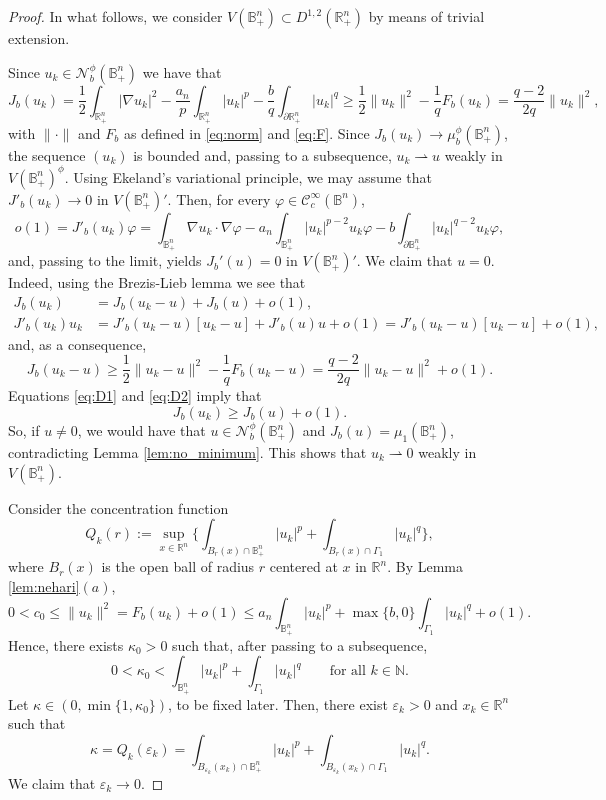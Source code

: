 \documentclass[10pt,a4paper]{amsart}
\def\D{\mathbb{B}^n_+}
\def\bn{\mathbb{B}^n}
\def\cC{\mathcal{C}}
\def\cN{\mathcal{N}}
\def\eps{\varepsilon}
\def\hn{\mathbb{R}^n_+}
\def\idhn{\int_{\partial\hn}}
\def\ihn{\int_{\hn}}
\def\n{\mathbb{N}}
\def\rh{\rightharpoonup}
\def\rn{\mathbb{R}^n}
\def\vp{\varphi}
\begin{document}
\begin{proof}
In what follows, we consider $V(\D)\subset D^{1,2}(\hn)$ by means of trivial extension. 

Since $u_k\in\cN_b^\phi(\D)$ we have that
$$J_b(u_k)=\frac{1}{2}\ihn|\nabla u_k|^2 - \frac{a_n}{p}\ihn|u_k|^p - \frac{b}{q}\idhn |u_k|^q\geq\frac{1}{2}\|u_k\|^2 - \frac{1}{q}F_b(u_k)=\frac{q-2}{2q}\|u_k\|^2,$$
with $\|\cdot\|$ and $F_b$ as defined in \eqref{eq:norm} and \eqref{eq:F}. Since $J_b(u_k)\to \mu^\phi_b(\D)$, the sequence $(u_k)$ is bounded and, passing to a subsequence, $u_k\rh u$ weakly in $V(\D)^\phi$. Using Ekeland's variational principle, we may assume that $J'_b(u_k)\to 0$ in $V(\D)'$. Then, for every $\vp\in \cC^\infty_c(\bn)$,
$$o(1)=J'_b(u_k)\vp=\int_{\D}\nabla u_k\cdot\nabla \vp - a_n\int_{\D} |u_k|^{p-2}u_k\vp - b\int_{\partial\D} |u_k|^{q-2}u_k\vp,$$
and, passing to the limit, yields $J_b'(u)=0$ in $V(\D)'$. We claim that $u=0$. Indeed, using the Brezis-Lieb lemma we see that
\begin{align}
J_b(u_k)&=J_b(u_k-u)+J_b(u)+o(1), \label{eq:D1}\\
J'_b(u_k)u_k&=J'_b(u_k-u)[u_k-u]+J'_b(u)u+o(1)=J'_b(u_k-u)[u_k-u]+o(1),\nonumber
\end{align}
and, as a consequence,
\begin{equation}\label{eq:D2}
J_b(u_k-u)\geq\frac{1}{2}\|u_k-u\|^2-\frac{1}{q}F_b(u_k-u)=\frac{q-2}{2q}\|u_k-u\|^2+o(1).
\end{equation}
Equations \eqref{eq:D1} and \eqref{eq:D2} imply that 
\begin{equation}\label{eq:D3}
J_b(u_k)\geq J_b(u)+o(1).
\end{equation}
So, if $u\neq 0$, we would have that $u\in\cN_b^\phi(\D)$ and $J_b(u)=\mu_1(\D)$, contradicting Lemma \ref{lem:no_minimum}. This shows that $u_k\rh 0$ weakly in $V(\D)$. 

Consider the concentration function
$$Q_k(r):=\sup _{x\in\rn}\Big\{\int_{B_r(x)\cap\D}|u_k|^p+\int_{B_r(x)\cap\Gamma_1}|u_k|^q\Big\},$$
where $B_r(x)$ is the open ball of radius $r$ centered at $x$ in $\rn$. By Lemma \ref{lem:nehari}$(a)$, 
$$0<c_0\leq\|u_k\|^2=F_b(u_k)+o(1)\leq a_n\int_{\D}|u_k|^p+\max\{b,0\}\int_{\Gamma_1}|u_k|^q+o(1).$$ 
Hence, there exists $\kappa_0>0$ such that, after passing to a subsequence, 
\begin{equation}\label{eq:kappa0}
0<\kappa_0<\int_{\D}|u_k|^p+\int_{\Gamma_1}|u_k|^q\qquad\text{for all \ }k\in\n.
\end{equation}
Let $\kappa\in (0,\min\{1,\kappa_0\})$, to be fixed later. Then, there exist $\eps_k>0$ and $x_k\in\rn$ such that
\begin{equation} \label{eq:kappa}
\kappa=Q_k(\eps_k)=\int_{B_{\eps_k}(x_k)\cap\D}|u_k|^p+\int_{B_{\eps_k}(x_k)\cap\Gamma_1}|u_k|^q.
\end{equation}
We claim that $\eps_k\to 0$. 


\end{proof}
\end{document}
